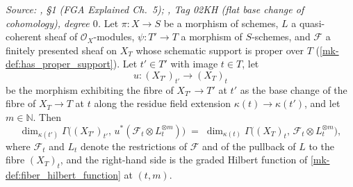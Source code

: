 \begin{lemma}\label{mk-lem:gamma_fiber_baseChange_field}
  \leanok

  \textit{Source: \cite{nitsure-hilbert-quot}, \S 1 (FGA Explained Ch.~5); \cite{stacks-project},
  Tag 02KH (flat base change of cohomology), degree \(0\).}
  Let \(\pi : X \to S\) be a morphism of schemes, \(L\) a quasi-coherent
  sheaf of \(\mathcal{O}_X\)-modules, \(\psi : T' \to T\) a morphism of
  \(S\)-schemes, and \(\mathcal{F}\) a finitely presented sheaf on \(X_T\)
  whose schematic support is proper over \(T\)
  (\ref{mk-def:has_proper_support}).  Let \(t' \in T'\) with image
  \(t \in T\), let
  \[
    u : (X_{T'})_{t'} \longrightarrow (X_T)_t
  \]
  be the morphism exhibiting the fibre of \(X_{T'} \to T'\) at \(t'\) as the
  base change of the fibre of \(X_T \to T\) at \(t\) along the residue field
  extension \(\kappa(t) \to \kappa(t')\), and let \(m \in \mathbb{N}\).
  Then
  \[
    \dim_{\kappa(t')} \Gamma\bigl((X_{T'})_{t'},\,
      u^*(\mathcal{F}_t \otimes L_t^{\otimes m})\bigr)
    \;=\;
    \dim_{\kappa(t)} \Gamma\bigl((X_T)_t,\,
      \mathcal{F}_t \otimes L_t^{\otimes m}\bigr),
  \]
  where \(\mathcal{F}_t\) and \(L_t\) denote the restrictions of
  \(\mathcal{F}\) and of the pullback of \(L\) to the fibre \((X_T)_t\), and
  the right-hand side is the graded Hilbert function of
  \ref{mk-def:fiber_hilbert_function} at \((t, m)\).
\end{lemma}
